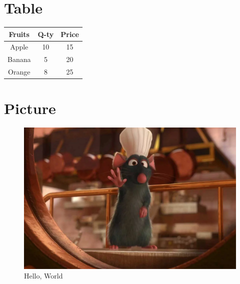 \documentclass{article}
\begin{document}
    \section*{ Table}
    \begin{tabular}{|c|c|c|}
\hline
Fruits & Q-ty & Price \\ \hline
Apple & 10 & 15 \\ \hline
Banana & 5 & 20 \\ \hline
Orange & 8 & 25 \\ \hline
\end{tabular}

    \section*{Picture}
    
\begin{figure}[h]
    \centering
    \includegraphics[width=0.8\linewidth]{ratatui.png}
    \caption{Hello, World}
    \label{}
\end{figure}
    

    
\end{document}
